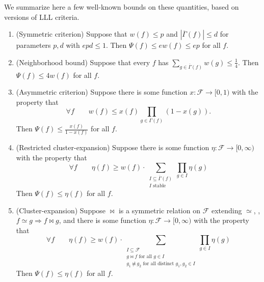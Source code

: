\documentclass{toc}
\begin{document}
  We summarize here a few well-known bounds  on these quantities, based on versions of LLL criteria.
\begin{proposition}
\label{main-bound-sum}
 \begin{enumerate}
\item (Symmetric criterion) Suppose that $w(f) \leq p$ and $|\overline \Gamma(f)| \leq d$ for parameters $p,d$ with $e p d \leq 1$.  Then $\Psi(f) \leq e w(f) \leq e p$ for all $f$.
\item (Neighborhood bound) Suppose that every $f$ has $\sum_{g \in \overline \Gamma(f)} w(g) \leq \tfrac{1}{4}$. Then $\Psi(f) \leq 4 w(f)$ for all  $f$.
\item (Asymmetric criterion) Suppose there is some function $x: \mathcal F \rightarrow [0,1)$ with the property that
$$
\forall f \qquad w(f) \leq x(f)  \prod_{g \in \Gamma(f)} (1 - x(g)).
$$
Then $\Psi(f) \leq \frac{x (f)}{1-x(f)}$ for all $f$.

\item (Restricted cluster-expansion) Suppose there is some function $\eta: \mathcal F \rightarrow [0,\infty)$ with the property that
$$
\forall f \qquad \eta(f) \geq w(f) \cdot \sum_{\substack{I \subseteq \overline \Gamma(f) \\ \text{$I$ stable}}} \prod_{g \in I} \eta(g)
$$
Then $\Psi(f) \leq \eta(f)$ for all $f$.


\item (Cluster-expansion) Suppose $\bowtie$ is a symmetric relation on $\mathcal F$ extending $\simeq$, \ie, $f \simeq g \Rightarrow f \bowtie g$, and there is some function $\eta: \mathcal F \rightarrow [0,\infty)$ with the property that
$$
\forall f \qquad \eta(f) \geq w(f) \cdot \sum_{\substack{I \subseteq \mathcal F \\ g \bowtie f \text{ for all $g \in I$}  \\ g_1 \not \bowtie g_2 \text{ for all distinct $g_1, g_2 \in I$}}} \prod_{g \in I} \eta(g)
$$
Then $\Psi(f) \leq \eta(f)$ for all $f$.
\end{enumerate}
\end{proposition}
\end{document}
